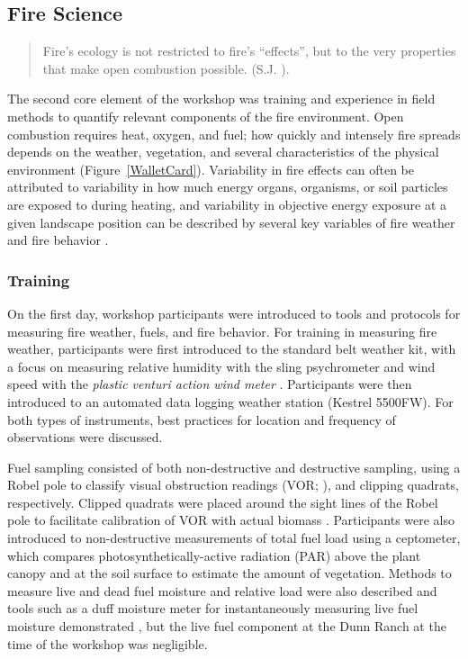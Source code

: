 \documentclass[fire,casereport,accept,moreauthors,pdftex]{Definitions/mdpi}  %
\begin{document}
\subsection{Fire Science}

\begin{quote}
Fire's ecology is not restricted to fire's ``effects'', but to the very properties that make open combustion possible. (S.J. \citet[][p.~126]{pyne2004}).
\end{quote}

The second core element of the workshop was training and experience in field methods to quantify relevant components of the fire environment.
Open combustion requires heat, oxygen, and fuel; how quickly and intensely fire spreads depends on the weather, vegetation, and several characteristics of the physical environment (Figure~\ref{WalletCard}).
Variability in fire effects can often be attributed to variability in how much energy organs, organisms, or soil particles are exposed to during heating, and variability in objective energy exposure at a given landscape position can be described by several key variables of fire weather and fire behavior \citep{mcgranahan2021}.

\subsubsection{Training}

On the first day, workshop participants were introduced to tools and protocols for measuring fire weather, fuels, and fire behavior.
For training in measuring fire weather, participants were first introduced to the standard belt weather kit, with a focus on measuring relative humidity with the sling psychrometer and wind speed with the \emph{plastic venturi action wind meter} \citep{BeltWxKit}.
Participants were then introduced to an automated data logging weather station (Kestrel 5500FW).
For both types of instruments, best practices for location and frequency of observations were discussed.

Fuel sampling consisted of both non-destructive and destructive sampling, using a Robel pole to classify visual obstruction readings (VOR; \citep{robel1970}), and clipping quadrats, respectively.
Clipped quadrats were placed around the sight lines of the Robel pole to facilitate calibration of VOR with actual biomass \citep{vermeire2002}.
Participants were also introduced to non-destructive measurements of total fuel load using a ceptometer, which compares photosynthetically-active radiation (PAR) above the plant canopy and at the soil surface to estimate the amount of vegetation.
Methods to measure live and dead fuel moisture and relative load were also described and tools such as a duff moisture meter for instantaneously measuring live fuel moisture demonstrated \citep{mcgranahan2019}, but the live fuel component at the Dunn Ranch at the time of the workshop was negligible.
\end{document}
